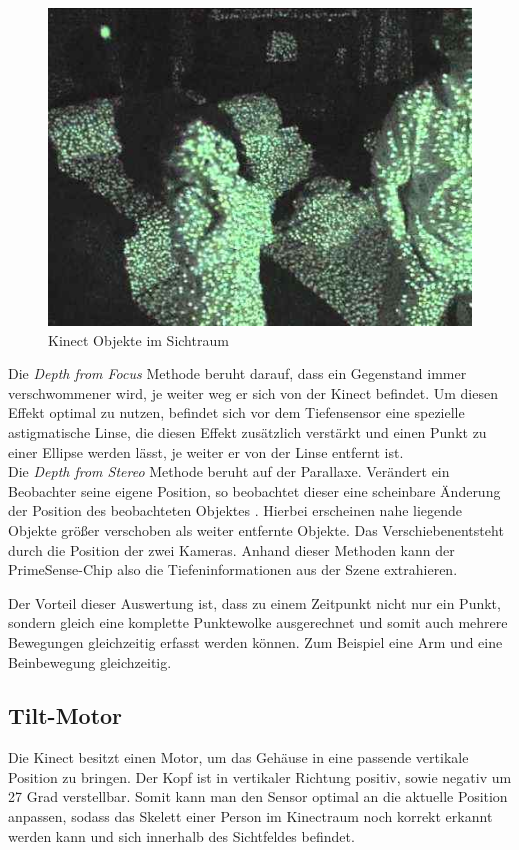	\begin{figure}[H]						
		\centering							
		\includegraphics[scale=0.5]{Bilder/kinect_dots_green.jpg}			
		\caption{Kinect Objekte im Sichtraum}						
		\label{f:kinect_dots_with_Object}						
	\end{figure}
	
	\noindent
Die \textit{Depth from Focus} Methode beruht darauf, dass ein Gegenstand immer verschwommener wird, je weiter weg er sich von der Kinect befindet. Um diesen Effekt optimal zu nutzen, befindet sich vor dem Tiefensensor eine spezielle astigmatische Linse, die diesen Effekt zusätzlich verstärkt und einen Punkt zu einer Ellipse werden lässt, je weiter er von der Linse entfernt ist.\cite{pdf:maccormick}	\\
Die \textit{Depth from Stereo} Methode beruht auf der Parallaxe. Verändert ein Beobachter seine eigene Position, so beobachtet dieser eine scheinbare Änderung der Position des beobachteten Objektes \cite{ws:wikiparallaxe}. Hierbei erscheinen nahe liegende Objekte größer verschoben als weiter entfernte Objekte. Das \glqq Verschieben\grqq entsteht durch die Position der zwei Kameras. Anhand dieser Methoden kann der PrimeSense-Chip also die Tiefeninformationen aus der Szene extrahieren.	
	
Der Vorteil dieser Auswertung ist, dass zu einem Zeitpunkt nicht nur ein Punkt, sondern gleich eine komplette Punktewolke ausgerechnet und somit auch mehrere Bewegungen gleichzeitig erfasst werden können. Zum Beispiel eine Arm und eine Beinbewegung gleichzeitig.
	
	
	
\subsection{Tilt-Motor}
	Die Kinect besitzt einen Motor, um das Gehäuse in eine passende vertikale Position zu bringen.
	Der Kopf ist in vertikaler Richtung positiv, sowie negativ um 27 Grad verstellbar. Somit kann
	man den Sensor optimal an die aktuelle Position anpassen, sodass das Skelett einer Person im
	Kinectraum noch korrekt erkannt werden kann und sich innerhalb des Sichtfeldes befindet.
	\cite{jana2012kinect}
	
